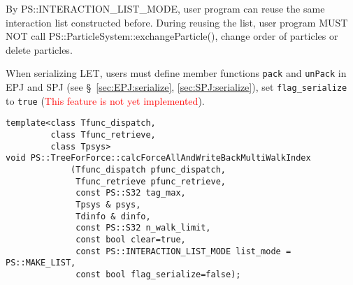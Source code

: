 \begin{itemize}
By PS::INTERACTION\_LIST\_MODE, user program can reuse the same interaction list constructed before. During reusing the list, user program MUST NOT call \newline  PS::ParticleSystem::exchangeParticle(), change order of particles or delete particles.

When serializing LET, users must define member functions \texttt{pack} and \texttt{unPack} in EPJ and SPJ (see \S~\ref{sec:EPJ:serialize}, \ref{sec:SPJ:serialize}), set \texttt{flag\_serialize} to \texttt{true} (\textcolor{red}{This feature is not yet implemented}).


\end{itemize}


\label{sec:module_standard_treeforforce_calcforceallandwritebackmultiwalkindex}

\begin{screen}
\begin{verbatim}
template<class Tfunc_dispatch,
         class Tfunc_retrieve,
         class Tpsys>
void PS::TreeForForce::calcForceAllAndWriteBackMultiWalkIndex
             (Tfunc_dispatch pfunc_dispatch,
              Tfunc_retrieve pfunc_retrieve,
              const PS::S32 tag_max,
              Tpsys & psys,
              Tdinfo & dinfo,
              const PS::S32 n_walk_limit,
              const bool clear=true,
              const PS::INTERACTION_LIST_MODE list_mode = PS::MAKE_LIST,
              const bool flag_serialize=false);
\end{verbatim}
\end{screen}

